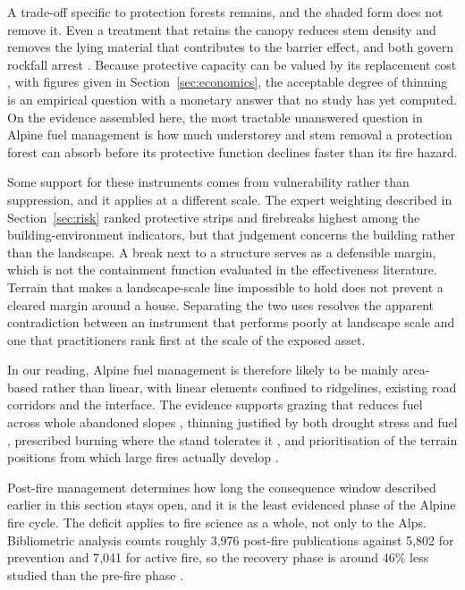 \documentclass[11pt,a4paper]{article}
\begin{document}
A trade-off specific to protection forests remains, and the shaded form does not remove it. Even a treatment that retains the canopy reduces stem density and removes the lying material that contributes to the barrier effect, and both govern rockfall arrest \citep{costa_biological_2021, moos_climate_2021}. Because protective capacity can be valued by its replacement cost \citep{accastello_asforesee_2019}, with figures given in Section~\ref{sec:economics}, the acceptable degree of thinning is an empirical question with a monetary answer that no study has yet computed. On the evidence assembled here, the most tractable unanswered question in Alpine fuel management is how much understorey and stem removal a protection forest can absorb before its protective function declines faster than its fire hazard.

Some support for these instruments comes from vulnerability rather than suppression, and it applies at a different scale. The expert weighting described in Section~\ref{sec:risk} ranked protective strips and firebreaks highest among the building-environment indicators, but that judgement concerns the building rather than the landscape. A break next to a structure serves as a defensible margin, which is not the containment function evaluated in the effectiveness literature. Terrain that makes a landscape-scale line impossible to hold does not prevent a cleared margin around a house. Separating the two uses resolves the apparent contradiction between an instrument that performs poorly at landscape scale and one that practitioners rank first at the scale of the exposed asset.

In our reading, Alpine fuel management is therefore likely to be mainly area-based rather than linear, with linear elements confined to ridgelines, existing road corridors and the interface. The evidence supports grazing that reduces fuel across whole abandoned slopes \citep{rouetleduc_effects_2021}, thinning justified by both drought stress and fuel \citep{giuggiola_droughtinduced_2010}, prescribed burning where the stand tolerates it \citep{gamba_prescribed_2025}, and prioritisation of the terrain positions from which large fires actually develop \citep{conedera_linking_2024, krsnik_spatial_2024}.

Post-fire management determines how long the consequence window described earlier in this section stays open, and it is the least evidenced phase of the Alpine fire cycle. The deficit applies to fire science as a whole, not only to the Alps. Bibliometric analysis counts roughly 3{,}976 post-fire publications against 5{,}802 for prevention and 7{,}041 for active fire, so the recovery phase is around 46\% less studied than the pre-fire phase \citep{goncalves_fostering_2025}.
\end{document}
